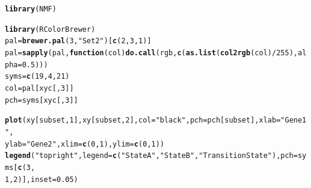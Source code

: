\documentclass{article}\usepackage[]{graphicx}\usepackage[]{color}
\makeatletter
\newcommand{\hlnum}[1]{\textcolor[rgb]{0.686,0.059,0.569}{#1}}%
\newcommand{\hlstr}[1]{\textcolor[rgb]{0.192,0.494,0.8}{#1}}%
\newcommand{\hlopt}[1]{\textcolor[rgb]{0,0,0}{#1}}%
\newcommand{\hlstd}[1]{\textcolor[rgb]{0.345,0.345,0.345}{#1}}%
\newcommand{\hlkwa}[1]{\textcolor[rgb]{0.161,0.373,0.58}{\textbf{#1}}}%
\newcommand{\hlkwb}[1]{\textcolor[rgb]{0.69,0.353,0.396}{#1}}%
\newcommand{\hlkwc}[1]{\textcolor[rgb]{0.333,0.667,0.333}{#1}}%
\newcommand{\hlkwd}[1]{\textcolor[rgb]{0.737,0.353,0.396}{\textbf{#1}}}%
\newenvironment{kframe}{%
 \def\at@end@of@kframe{}%
 \ifinner\ifhmode%
  \def\at@end@of@kframe{\end{minipage}}%
  \begin{minipage}{\columnwidth}%
 \fi\fi%
 \def\FrameCommand##1{\hskip\@totalleftmargin \hskip-\fboxsep
 \colorbox{shadecolor}{##1}\hskip-\fboxsep
     \hskip-\linewidth \hskip-\@totalleftmargin \hskip\columnwidth}%
 \MakeFramed {\advance\hsize-\width
   \@totalleftmargin\z@ \linewidth\hsize
   \@setminipage}}%
 {\par\unskip\endMakeFramed%
 \at@end@of@kframe}
\newenvironment{knitrout}{}{} %
\makeatother
\begin{document}
\begin{knitrout}
\color{fgcolor}\begin{kframe}
\begin{alltt}
\hlkwd{library}\hlstd{(NMF)}
\end{alltt}


{\ttfamily\noindent\itshape\color{messagecolor}{\#\# Loading required package: methods\\\#\# Loading required package: pkgmaker\\\#\# Loading required package: registry\\\#\# Loading required package: rngtools\\\#\# Loading required package: cluster\\\#\# NMF - BioConductor layer [OK] | Shared memory capabilities [OK] | Cores 7/8}}\begin{alltt}
\hlkwd{library}\hlstd{(RColorBrewer)}
\hlstd{pal} \hlkwb{=} \hlkwd{brewer.pal}\hlstd{(}\hlnum{3}\hlstd{,} \hlstr{"Set2"}\hlstd{)[}\hlkwd{c}\hlstd{(}\hlnum{2}\hlstd{,} \hlnum{3}\hlstd{,} \hlnum{1}\hlstd{)]}
\hlstd{pal} \hlkwb{=} \hlkwd{sapply}\hlstd{(pal,} \hlkwa{function}\hlstd{(}\hlkwc{col}\hlstd{)} \hlkwd{do.call}\hlstd{(rgb,} \hlkwd{c}\hlstd{(}\hlkwd{as.list}\hlstd{(}\hlkwd{col2rgb}\hlstd{(col)}\hlopt{/}\hlnum{255}\hlstd{),} \hlkwc{alpha} \hlstd{=} \hlnum{0.5}\hlstd{)))}
\hlstd{syms} \hlkwb{=} \hlkwd{c}\hlstd{(}\hlnum{19}\hlstd{,} \hlnum{4}\hlstd{,} \hlnum{21}\hlstd{)}
\hlstd{col} \hlkwb{=} \hlstd{pal[xyc[,} \hlnum{3}\hlstd{]]}
\hlstd{pch} \hlkwb{=} \hlstd{syms[xyc[,} \hlnum{3}\hlstd{]]}

\hlkwd{plot}\hlstd{(xy[subset,} \hlnum{1}\hlstd{], xy[subset,} \hlnum{2}\hlstd{],} \hlkwc{col} \hlstd{=} \hlstr{"black"}\hlstd{,} \hlkwc{pch} \hlstd{= pch[subset],} \hlkwc{xlab} \hlstd{=} \hlstr{"Gene 1"}\hlstd{,}
    \hlkwc{ylab} \hlstd{=} \hlstr{"Gene 2"}\hlstd{,} \hlkwc{xlim} \hlstd{=} \hlkwd{c}\hlstd{(}\hlnum{0}\hlstd{,} \hlnum{1}\hlstd{),} \hlkwc{ylim} \hlstd{=} \hlkwd{c}\hlstd{(}\hlnum{0}\hlstd{,} \hlnum{1}\hlstd{))}
\hlkwd{legend}\hlstd{(}\hlstr{"topright"}\hlstd{,} \hlkwc{legend} \hlstd{=} \hlkwd{c}\hlstd{(}\hlstr{"State A"}\hlstd{,} \hlstr{"State B"}\hlstd{,} \hlstr{"Transition State"}\hlstd{),} \hlkwc{pch} \hlstd{= syms[}\hlkwd{c}\hlstd{(}\hlnum{3}\hlstd{,}
    \hlnum{1}\hlstd{,} \hlnum{2}\hlstd{)],} \hlkwc{inset} \hlstd{=} \hlnum{0.05}\hlstd{)}
\end{alltt}
\end{kframe}


\end{knitrout}
\end{document}

